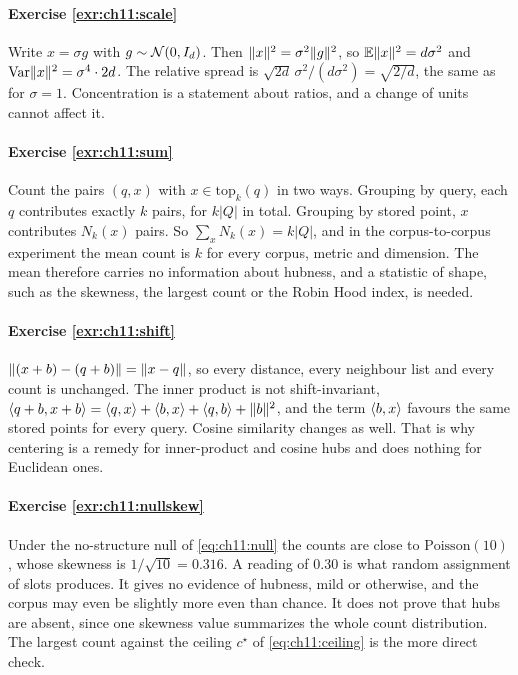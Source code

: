 
\paragraph{Exercise \ref{exr:ch11:scale}}
Write $x=\sigma g$ with $g\sim\mathcal{N}(0,I_d)$. Then $\lVert x\rVert^2=\sigma^2\lVert g\rVert^2$, so
$\mathbb{E}\lVert x\rVert^2=d\sigma^2$ and $\operatorname{Var}\lVert x\rVert^2=\sigma^4\cdot2d$. The relative spread is
$\sqrt{2d}\,\sigma^2/(d\sigma^2)=\sqrt{2/d}$, the same as for $\sigma=1$. Concentration
is a statement about ratios, and a change of units cannot affect it.

\paragraph{Exercise \ref{exr:ch11:sum}}
Count the pairs $(q,x)$ with $x\in\mathrm{top}_k(q)$ in two ways. Grouping by query,
each $q$ contributes exactly $k$ pairs, for $k|Q|$ in total. Grouping by stored point,
$x$ contributes $N_k(x)$ pairs. So $\sum_xN_k(x)=k|Q|$, and in the corpus-to-corpus
experiment the mean count is $k$ for every corpus, metric and dimension. The mean
therefore carries no information about hubness, and a statistic of shape, such as the
skewness, the largest count or the Robin Hood index, is needed.

\paragraph{Exercise \ref{exr:ch11:shift}}
$\lVert (x+b)-(q+b)\rVert=\lVert x-q\rVert$, so every distance, every neighbour list and every count
is unchanged. The inner product is not shift-invariant,
$\langle q+b,x+b\rangle=\langle q,x\rangle+\langle b,x\rangle+\langle q,b\rangle+\lVert b\rVert^2$, and the term $\langle b,x\rangle$
favours the same stored points for every query. Cosine similarity changes as well.
That is why centering is a remedy for inner-product and cosine hubs and does nothing
for Euclidean ones.

\paragraph{Exercise \ref{exr:ch11:nullskew}}
Under the no-structure null of \cref{eq:ch11:null} the counts are close to
$\mathrm{Poisson}(10)$, whose skewness is $1/\sqrt{10}=0.316$. A reading of $0.30$ is
what random assignment of slots produces. It gives no evidence of hubness, mild or
otherwise, and the corpus may even be slightly more even than chance. It does not
prove that hubs are absent, since one skewness value summarizes the whole count
distribution. The largest count against the ceiling $c^\star$ of
\cref{eq:ch11:ceiling} is the more direct check.

